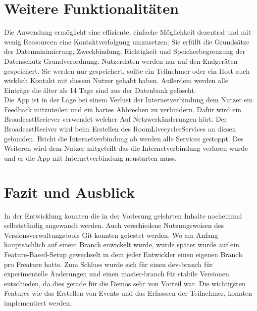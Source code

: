 \section{Weitere Funktionalitäten}
\label{sec:sonstiges}
Die Anwendung ermöglicht eine effiziente, einfache Möglichkeit dezentral und mit wenig Ressourcen eine Kontaktverfolgung umzusetzen.
Sie erfüllt die Grundsätze der Datenminimierung, Zweckbindung, Richtigkeit und Speicherbegrenzung der Datenschutz Grundverordnung. Nutzerdaten werden nur auf den Endgeräten gespeichert. 
Sie werden nur gespeichert, sollte ein Teilnehmer oder ein Host auch wirklich Kontakt mit diesem Nutzer gehabt haben. 
Außerdem werden alle Einträge die älter als 14 Tage sind aus der Datenbank gelöscht.\\
Die App ist in der Lage bei einem Verlust der Internetverbindung dem Nutzer ein Feedback mitzuteilen und ein hartes Abbrechen zu verhindern. 
Dafür wird ein BroadcastReciever verwendet welcher Auf Netzwerkänderungen hört. 
Der BroadcastReciver wird beim Erstellen des RoomLivecyclesServices an diesen gebunden.
 Bricht die Internetverbindung ab werden alle Services gestoppt. 
Des Weiteren wird dem Nutzer mitgeteilt das die Internetverbindung verloren wurde und er die App mit Internetverbindung neustarten muss.

\section{Fazit und Ausblick}
\label{sec:FuA}

In der Entwicklung konnten die in der Vorlesung gelehrten Inhalte nocheinmal selbstständig angewandt werden. 
Auch verschiedene Nutzungsweisen des Versionsverwaltungstools Git konnten getestet werden. 
Wo am Anfang hauptsächlich auf einem Branch enwickelt wurde, wurde später wurde auf ein Feature-Based-Setup gewechselt in dem jeder Entwickler einen eigenen Branch pro Freature hatte.
Zum Schluss wurde sich für einen dev-branch für experimentelle Änderungen und einen master-branch für stabile Versionen entschieden, da dies gerade für die Demos sehr von Vorteil war. 
Die wichtigsten Features wie das Erstellen von Events und das Erfasssen der Teilnehmer, konnten implementiert werden.

